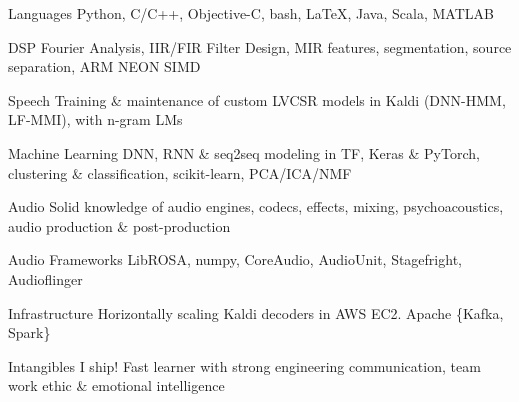 

\begin{cvskills}

  \cvskill
    {Languages} %
    {Python, C/C++, Objective-C, bash, LaTeX, Java, Scala, MATLAB}

  \cvskill
    {DSP} %
    {Fourier Analysis, IIR/FIR Filter Design, MIR features, segmentation, source separation, ARM NEON SIMD} %
    
  \cvskill
    {Speech} %
    {Training \& maintenance of custom LVCSR models in Kaldi (DNN-HMM, LF-MMI), with n-gram LMs} %

  \cvskill
    {Machine Learning} %
    {DNN, RNN \& seq2seq modeling in TF, Keras \& PyTorch, clustering \& classification, scikit-learn, PCA/ICA/NMF} %
       
  \cvskill
    {Audio} %
    {Solid knowledge of audio engines, codecs, effects, mixing, psychoacoustics, audio production \& post-production } %

  \cvskill
    {Audio Frameworks} %
    {LibROSA, numpy, CoreAudio, AudioUnit, Stagefright, Audioflinger} %

  \cvskill
    {Infrastructure} %
    {Horizontally scaling Kaldi decoders in AWS EC2. Apache \{Kafka, Spark\}} %

  \cvskill
    {Intangibles} %
    {I ship! Fast learner with strong engineering communication, team work ethic \& emotional intelligence} %



\end{cvskills}

